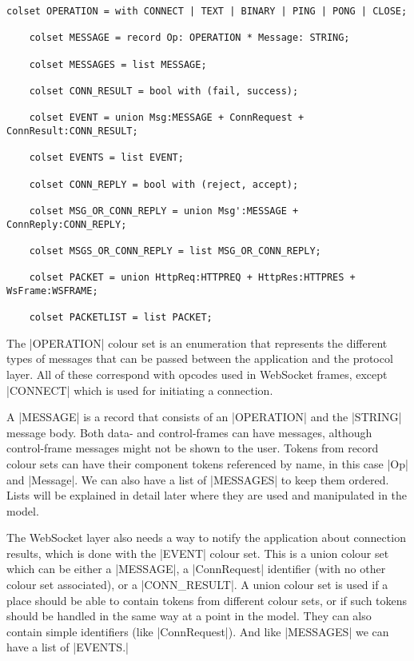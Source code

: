 	\begin{lstlisting}[label=lst:overview_colset,caption=Overview colour
	sets,gobble=1]
	colset OPERATION = with CONNECT | TEXT | BINARY | PING | PONG | CLOSE;
		
	colset MESSAGE = record Op: OPERATION *	Message: STRING;
	
	colset MESSAGES = list MESSAGE;
	
	colset CONN_RESULT = bool with (fail, success);
	
	colset EVENT = union Msg:MESSAGE + ConnRequest + ConnResult:CONN_RESULT;
	
	colset EVENTS = list EVENT;
	
	colset CONN_REPLY = bool with (reject, accept);
	
	colset MSG_OR_CONN_REPLY = union Msg':MESSAGE + ConnReply:CONN_REPLY;
	
	colset MSGS_OR_CONN_REPLY = list MSG_OR_CONN_REPLY;
	
	colset PACKET = union HttpReq:HTTPREQ + HttpRes:HTTPRES + WsFrame:WSFRAME;
	
	colset PACKETLIST = list PACKET;
	\end{lstlisting}
	
	The |OPERATION| colour set is an enumeration that represents the
	different types of messages that can be passed between the application and the
	protocol layer. All of these correspond with opcodes
	used in WebSocket frames, except |CONNECT| which is used for
	initiating a connection.
	
	A |MESSAGE| is a record that consists of an	|OPERATION| and the |STRING|
	message body. Both data- and control-frames can have messages, although
	control-frame messages might not be shown to the user. Tokens from record
	colour sets can have their component tokens referenced by name, in this case
	|Op| and |Message|. We can also have a list of |MESSAGES| to keep them ordered.
	Lists will be explained in detail later where they are used and manipulated
	in the model.
	
	The WebSocket layer also needs a way to notify the application about connection
	results, which is done with the |EVENT| colour set. This is a union
	colour set which can be either a |MESSAGE|, a |ConnRequest|
	identifier (with no other colour set associated), or a |CONN_RESULT|. A
	union colour set is used if a place should be able to contain tokens from
	different colour sets, or if such tokens should be handled in the same way at
	a point in the model. They can also contain simple identifiers (like
	|ConnRequest|). And like |MESSAGES| we can have a list of
	|EVENTS.|
	
